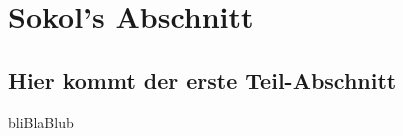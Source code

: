 \section{Sokol's Abschnitt}\label{Sokol}
\subsection{Hier kommt der erste Teil-Abschnitt }
bliBlaBlub